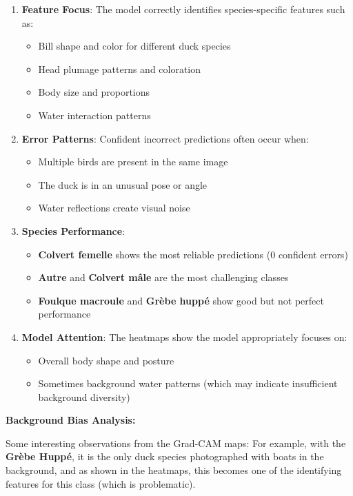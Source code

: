\documentclass[12pt,a4paper]{article}
\begin{document}
\begin{enumerate}
    \item \textbf{Feature Focus}: The model correctly identifies species-specific features such as:
    \begin{itemize}
        \item Bill shape and color for different duck species
        \item Head plumage patterns and coloration
        \item Body size and proportions
        \item Water interaction patterns
    \end{itemize}

    \item \textbf{Error Patterns}: Confident incorrect predictions often occur when:
    \begin{itemize}
        \item Multiple birds are present in the same image
        \item The duck is in an unusual pose or angle
        \item Water reflections create visual noise
    \end{itemize}

    \item \textbf{Species Performance}:
    \begin{itemize}
        \item \textbf{Colvert femelle} shows the most reliable predictions (0 confident errors)
        \item \textbf{Autre} and \textbf{Colvert mâle} are the most challenging classes
        \item \textbf{Foulque macroule} and \textbf{Grèbe huppé} show good but not perfect performance
    \end{itemize}

    \item \textbf{Model Attention}: The heatmaps show the model appropriately focuses on:
    \begin{itemize}
        \item Overall body shape and posture
        \item Sometimes background water patterns (which may indicate insufficient background diversity)
    \end{itemize}
\end{enumerate}

\textbf{Background Bias Analysis:}

Some interesting observations from the Grad-CAM maps: For example, with the \textbf{Grèbe Huppé}, it is the only duck species photographed with boats in the background, and as shown in the heatmaps, this becomes one of the identifying features for this class (which is problematic).
\end{document}
